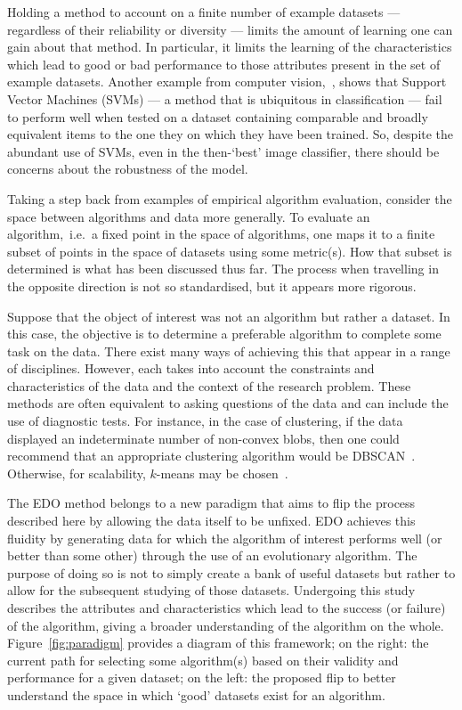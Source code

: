 Holding a method to account on a finite number of example datasets ---
regardless of their reliability or diversity --- limits the amount of learning
one can gain about that method. In particular, it limits the learning of the
characteristics which lead to good or bad performance to those attributes
present in the set of example datasets. Another example from computer
vision,~\cite{Torralba2011}, shows that Support Vector Machines (SVMs) --- a
method that is ubiquitous in classification --- fail to perform well when tested
on a dataset containing comparable and broadly equivalent items to the one they
on which they have been trained. So, despite the abundant use of SVMs, even in
the then-`best' image classifier, there should be concerns about the robustness
of the model.

Taking a step back from examples of empirical algorithm evaluation, consider the
space between algorithms and data more generally. To evaluate an
algorithm,~i.e.\ a fixed point in the space of algorithms, one maps it to a
finite subset of points in the space of datasets using some metric(s). How that
subset is determined is what has been discussed thus far. The process when
travelling in the opposite direction is not so standardised, but it appears more
rigorous.

Suppose that the object of interest was not an algorithm but rather a dataset.
In this case, the objective is to determine a preferable algorithm to complete
some task on the data. There exist many ways of achieving this that appear in a
range of disciplines. However, each takes into account the constraints and
characteristics of the data and the context of the research problem. These
methods are often equivalent to asking questions of the data and can include the
use of diagnostic tests. For instance, in the case of clustering, if the data
displayed an indeterminate number of non-convex blobs, then one could recommend
that an appropriate clustering algorithm would be DBSCAN~\cite{Ester1996}.
Otherwise, for scalability, \(k\)-means may be chosen~\cite{Wu2009,Zhao2009}.

The EDO method belongs to a new paradigm that aims to flip the process described
here by allowing the data itself to be unfixed. EDO achieves this fluidity by
generating data for which the algorithm of interest performs well (or better
than some other) through the use of an evolutionary algorithm. The purpose of
doing so is not to simply create a bank of useful datasets but rather to allow
for the subsequent studying of those datasets. Undergoing this study describes
the attributes and characteristics which lead to the success (or failure) of the
algorithm, giving a broader understanding of the algorithm on the whole.
Figure~\ref{fig:paradigm} provides a diagram of this framework; on the right:
the current path for selecting some algorithm(s) based on their validity and
performance for a given dataset; on the left: the proposed flip to better
understand the space in which `good' datasets exist for an algorithm.

